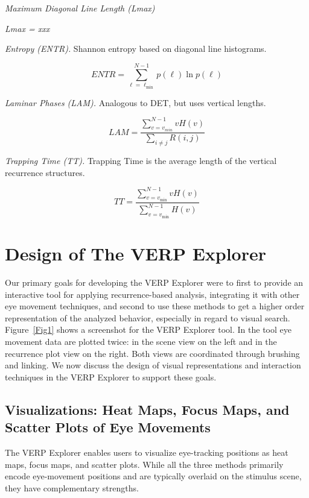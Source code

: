 \documentclass{sigchi}
\begin{document}
\emph{Maximum Diagonal Line Length (Lmax)}

\emph{Lmax = xxx}

\emph{Entropy (ENTR).}  Shannon entropy based on diagonal line histograms.

\[
	ENTR = \sum_{\ell = \ell_{\min}}^{N-1} {p(\ell)\ln p(\ell) }
\]
 
\emph{Laminar Phases (LAM).} Analogous to DET, but uses vertical lengths.

\[
	LAM =
	\frac{
		\sum_{v = v_{min} }^{N - 1} { vH(v) }
	}{
		\sum_{i\neq j}{ R(i,j)}
	}
\]
 
\emph{Trapping Time (TT).} Trapping Time is the average length of the
vertical recurrence structures.
 
\[
	TT = 
	\frac{
		\sum_{v=v_{\min} }^{N-1}{vH(v)}
 	}{
		\sum_{v=v_{\min} }^{N-1}{ H(v)}
 	}
\]


\section{Design of The VERP Explorer}
Our primary goals for developing the VERP Explorer were to first to provide
an interactive tool for applying recurrence-based analysis, integrating it
with other eye movement techniques, and second to use these methods to get
a higher order representation of the analyzed behavior, especially in
regard to visual search. Figure~\ref{Fig1} shows a screenshot for the VERP Explorer
tool.  In the tool eye movement data are plotted twice: in the scene view
on the left and in the recurrence plot view on the right.  Both views are
coordinated through brushing and linking. We now discuss the design of
visual representations and interaction techniques in the VERP Explorer to
support these goals. 



\subsection{Visualizations: Heat Maps, Focus Maps, and Scatter Plots of Eye
Movements} The VERP Explorer enables users to visualize eye-tracking
positions as heat maps, focus maps, and scatter plots.  While all the three
methods primarily encode eye-movement positions and are typically overlaid
on the stimulus scene, they have complementary strengths.  
\end{document}

